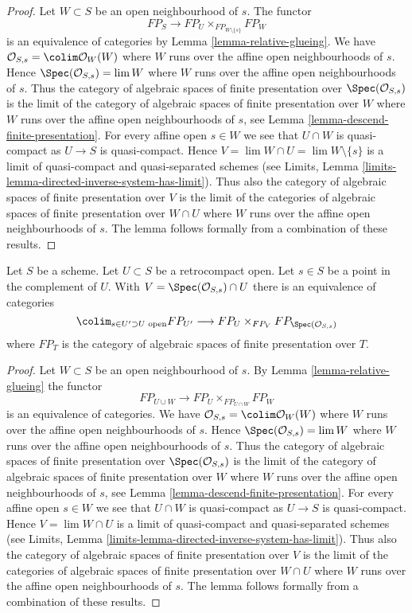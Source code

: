 \begin{proof}
Let $W \subset S$ be an open neighbourhood of $s$. The functor
$$
FP_S \to FP_U \times_{FP_{W \setminus \{s\}}} FP_W
$$
is an equivalence of categories by Lemma \ref{lemma-relative-glueing}.
We have $\mathcal{O}_{S, s} = \colim \mathcal{O}_W(W)$ where
$W$ runs over the affine open neighbourhoods of $s$.
Hence $\Spec(\mathcal{O}_{S, s}) = \lim W$ where $W$
runs over the affine open neighbourhoods of $s$.
Thus the category of algebraic spaces of finite presentation
over $\Spec(\mathcal{O}_{S, s})$ is the limit of the
category of algebraic spaces of finite presentation over
$W$ where $W$ runs over the affine open neighbourhoods
of $s$, see
Lemma \ref{lemma-descend-finite-presentation}.
For every affine open $s \in W$ we see that $U \cap W$
is quasi-compact as $U \to S$ is quasi-compact.
Hence $V = \lim W \cap U = \lim W \setminus \{s\}$ is a limit of
quasi-compact and quasi-separated schemes (see
Limits, Lemma \ref{limits-lemma-directed-inverse-system-has-limit}).
Thus also the category of algebraic spaces of finite presentation
over $V$ is the limit of the
categories of algebraic spaces of finite presentation over
$W \cap U$ where $W$ runs over the affine open neighbourhoods
of $s$. The lemma follows formally from a combination
of these results.
\end{proof}

\begin{lemma}
\label{lemma-glueing-near-point}
Let $S$ be a scheme. Let $U \subset S$ be a retrocompact open.
Let $s \in S$ be a point in the complement of $U$. With
$V = \Spec(\mathcal{O}_{S, s}) \cap U$ there is
an equivalence of categories
$$
\colim_{s \in U' \supset U\text{ open}} FP_{U'}
\longrightarrow
FP_U \times_{FP_V} FP_{\Spec(\mathcal{O}_{S, s})}
$$
where $FP_T$  is the category of algebraic spaces of finite presentation
over $T$.
\end{lemma}

\begin{proof}
Let $W \subset S$ be an open neighbourhood of $s$. By
Lemma \ref{lemma-relative-glueing} the functor
$$
FP_{U \cup W}
\longrightarrow
FP_U \times_{FP_{U \cap W}} FP_W
$$
is an equivalence of categories. We have
$\mathcal{O}_{S, s} = \colim \mathcal{O}_W(W)$ where
$W$ runs over the affine open neighbourhoods of $s$.
Hence $\Spec(\mathcal{O}_{S, s}) = \lim W$ where $W$
runs over the affine open neighbourhoods of $s$.
Thus the category of algebraic spaces of finite presentation
over $\Spec(\mathcal{O}_{S, s})$ is the limit of the
category of algebraic spaces of finite presentation over
$W$ where $W$ runs over the affine open neighbourhoods
of $s$, see
Lemma \ref{lemma-descend-finite-presentation}.
For every affine open $s \in W$ we see that $U \cap W$
is quasi-compact as $U \to S$ is quasi-compact.
Hence $V = \lim W \cap U$ is a limit of
quasi-compact and quasi-separated schemes (see
Limits, Lemma \ref{limits-lemma-directed-inverse-system-has-limit}).
Thus also the category of algebraic spaces of finite presentation
over $V$ is the limit of the
categories of algebraic spaces of finite presentation over
$W \cap U$ where $W$ runs over the affine open neighbourhoods
of $s$. The lemma follows formally from a combination
of these results.
\end{proof}

